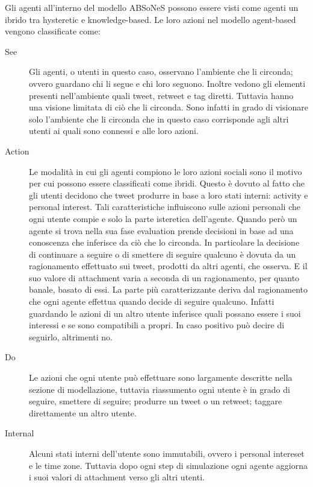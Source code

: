 \documentclass[a4paper,12pt]{article}
\begin{document}
Gli agenti all'interno del modello ABSoNeS possono essere visti come agenti un ibrido tra hysteretic e knowledge-based. Le loro azioni nel modello agent-based vengono classificate come:
\begin{description}
    \item[See] Gli agenti, o utenti in questo caso,
    osservano l'ambiente che li circonda; ovvero guardano chi li segue e chi loro seguono. Inoltre vedono gli elementi presenti nell'ambiente quali tweet, retweet e tag diretti. Tuttavia hanno una visione limitata di ci\`o che li circonda. Sono infatti in grado di visionare solo l'ambiente che li circonda che in questo caso corrisponde agli altri utenti ai quali sono connessi e alle loro azioni.
    \item[Action] Le modalit\`a in cui gli agenti compiono le loro azioni sociali sono il motivo per cui possono essere classificati come ibridi.
    Questo \`e dovuto al fatto che gli utenti decidono che tweet produrre in base a loro stati interni: activity e personal interest. Tali caratteristiche influiscono sulle azioni personali che ogni utente compie e solo la parte isteretica dell'agente.
    Quando per\`o un agente si trova nella sua fase evaluation prende decisioni in base ad una conoscenza che inferisce da ci\`o che lo circonda. 
    In particolare la decisione di continuare a seguire o di smettere di seguire qualcuno \`e dovuta da un ragionamento effettuato sui tweet, prodotti da altri agenti, che osserva. E il suo valore di attachment varia a seconda di un ragionamento, per quanto banale, basato di essi.
    La parte pi\`u caratterizzante deriva dal ragionamento che ogni agente effettua quando decide di seguire qualcuno. Infatti guardando le azioni di un altro utente inferisce quali possano essere i suoi interessi e se sono compatibili a propri. In caso positivo pu\`o decire di seguirlo, altrimenti no.
    \item[Do] Le azioni che ogni utente pu\`o effettuare sono largamente descritte nella sezione di modellazione, tuttavia riassumento ogni utente \`e in grado di seguire, smettere di seguire; produrre un tweet o un retweet; taggare direttamente un altro utente.
    \item[Internal] Alcuni stati interni dell'utente sono immutabili, ovvero i personal intereset e le time zone. Tuttavia dopo ogni step di simulazione ogni agente aggiorna i suoi valori di attachment verso gli altri utenti.
\end{description}
\end{document}

